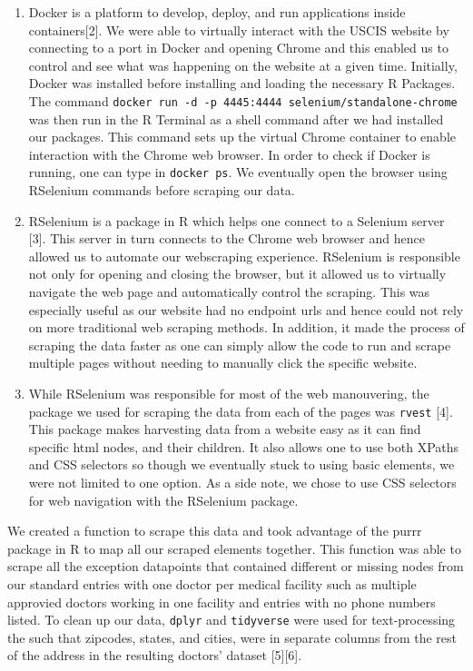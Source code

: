 \documentclass[10pt,letterpaper]{article}
\begin{document}
\begin{enumerate}
\def\labelenumi{\arabic{enumi}.}
\item
  Docker is a platform to develop, deploy, and run applications inside
  containers{[}2{]}. We were able to virtually interact with the USCIS
  website by connecting to a port in Docker and opening Chrome and this
  enabled us to control and see what was happening on the website at a
  given time. Initially, Docker was installed before installing and
  loading the necessary R Packages. The command
  \texttt{docker\ run\ -d\ -p\ 4445:4444\ selenium/standalone-chrome}
  was then run in the R Terminal as a shell command after we had
  installed our packages. This command sets up the virtual Chrome
  container to enable interaction with the Chrome web browser. In order
  to check if Docker is running, one can type in \texttt{docker\ ps}. We
  eventually open the browser using RSelenium commands before scraping
  our data.
\item
  RSelenium is a package in R which helps one connect to a Selenium
  server {[}3{]}. This server in turn connects to the Chrome web browser
  and hence allowed us to automate our webscraping experience. RSelenium
  is responsible not only for opening and closing the browser, but it
  allowed us to virtually navigate the web page and automatically
  control the scraping. This was especially useful as our website had no
  endpoint urls and hence could not rely on more traditional web
  scraping methods. In addition, it made the process of scraping the
  data faster as one can simply allow the code to run and scrape
  multiple pages without needing to manually click the specific website.
\item
  While RSelenium was responsible for most of the web manouvering, the
  package we used for scraping the data from each of the pages was
  \texttt{rvest} {[}4{]}. This package makes harvesting data from a
  website easy as it can find specific html nodes, and their children.
  It also allows one to use both XPaths and CSS selectors so though we
  eventually stuck to using basic elements, we were not limited to one
  option. As a side note, we chose to use CSS selectors for web
  navigation with the RSelenium package.
\end{enumerate}

We created a function to scrape this data and took advantage of the
purrr package in R to map all our scraped elements together. This
function was able to scrape all the exception datapoints that contained
different or missing nodes from our standard entries with one doctor per
medical facility such as multiple approvied doctors working in one
facility and entries with no phone numbers listed. To clean up our data,
\texttt{dplyr} and \texttt{tidyverse} were used for text-processing the
such that zipcodes, states, and cities, were in separate columns from
the rest of the address in the resulting doctors' dataset
{[}5{]}{[}6{]}.
\end{document}
